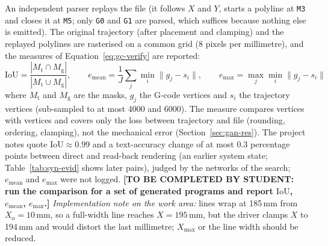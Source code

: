 An independent parser replays the file (it follows $X$ and $Y$, starts a polyline at \texttt{M3} and closes it at \texttt{M5}; only \texttt{G0} and \texttt{G1} are parsed, which suffices because nothing else is emitted).
The original trajectory (after placement and clamping) and the replayed polylines are rasterised on a common grid (8 pixels per millimetre), and the measures of Equation~\ref{eq:gc-verify} are reported:
\begin{equation}
\mathrm{IoU}=\frac{|M_{\mathrm t}\cap M_{\mathrm g}|}{|M_{\mathrm t}\cup M_{\mathrm g}|},\qquad e_{\mathrm{mean}}=\frac{1}{J}\sum_j\min_i\lVert g_j-s_i\rVert,\qquad e_{\max}=\max_j\min_i\lVert g_j-s_i\rVert
\label{eq:gc-verify}
\end{equation}
where $M_{\mathrm t}$ and $M_{\mathrm g}$ are the masks, $g_j$ the G-code vertices and $s_i$ the trajectory vertices (sub-sampled to at most 4000 and 6000).
The measure compares vertices with vertices and covers only the loss between trajectory and file (rounding, ordering, clamping), not the mechanical error (Section~\ref{sec:gan-res}).
The project notes quote $\mathrm{IoU}\approx0.99$ and a text-accuracy change of at most 0.3 percentage points between direct and read-back rendering (an earlier system state; Table~\ref{tab:syn-evid} shows later pairs), judged by the networks of the search; $e_{\mathrm{mean}}$ and $e_{\max}$ were not logged.
\textbf{[TO BE COMPLETED BY STUDENT: run the comparison for a set of generated programs and report $\mathrm{IoU}$, $e_{\mathrm{mean}}$, $e_{\max}$.]}
\emph{Implementation note on the work area:} lines wrap at 185\,mm from $X_{\mathrm o}=10$\,mm, so a full-width line reaches $X=195$\,mm, but the driver clamps $X$ to 194\,mm and would distort the last millimetre; $X_{\max}$ or the line width should be reduced.
